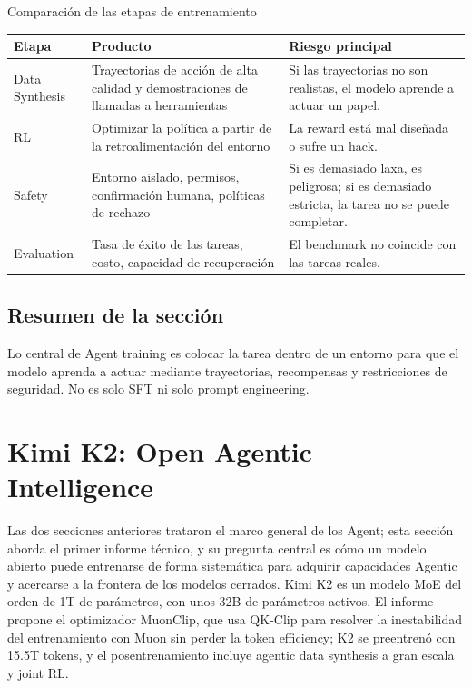 \documentclass[a4paper]{article}
\begin{document}
\begin{knowledgebox}{Comparación de las etapas de entrenamiento}
\begin{tabularx}{\textwidth}{p{}p{}X}
\toprule
Etapa & Producto & Riesgo principal \\
\midrule
Data Synthesis & Trayectorias de acción de alta calidad y demostraciones de llamadas a herramientas & Si las trayectorias no son realistas, el modelo aprende a actuar un papel. \\
RL & Optimizar la política a partir de la retroalimentación del entorno & La reward está mal diseñada o sufre un hack. \\
Safety & Entorno aislado, permisos, confirmación humana, políticas de rechazo & Si es demasiado laxa, es peligrosa; si es demasiado estricta, la tarea no se puede completar. \\
Evaluation & Tasa de éxito de las tareas, costo, capacidad de recuperación & El benchmark no coincide con las tareas reales. \\
\bottomrule
\end{tabularx}
\end{knowledgebox}

\subsection{Resumen de la sección}

Lo central de Agent training es colocar la tarea dentro de un entorno para que el modelo aprenda a actuar mediante trayectorias, recompensas y restricciones de seguridad. No es solo SFT ni solo prompt engineering.
\section{Kimi K2: Open Agentic Intelligence}

Las dos secciones anteriores trataron el marco general de los Agent; esta sección aborda el primer informe técnico, y su pregunta central es cómo un modelo abierto puede entrenarse de forma sistemática para adquirir capacidades Agentic y acercarse a la frontera de los modelos cerrados. Kimi K2 es un modelo MoE del orden de 1T de parámetros, con unos 32B de parámetros activos. El informe propone el optimizador MuonClip, que usa QK-Clip para resolver la inestabilidad del entrenamiento con Muon sin perder la token efficiency; K2 se preentrenó con 15.5T tokens, y el posentrenamiento incluye agentic data synthesis a gran escala y joint RL.
\end{document}
